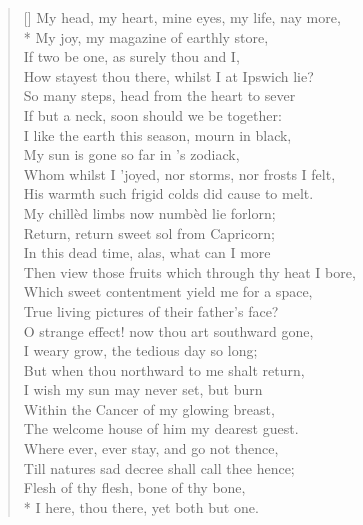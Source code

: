 \documentclass[MAIN]{subfiles}
\begin{document}
\settowidth{\versewidth}{My head, my heart, mine eyes, my life, nay more,}
\begin{verse}[\versewidth]
My head, my heart, mine eyes, my life, nay more,\\* 
My joy, my magazine of earthly store,\\ 
If two be one, as surely thou and I,\\
How stayest thou there, whilst I at {\sc Ipswich} lie?\\
So many steps, head from the heart to sever\\
If but a neck, soon should we be together:\\
I like the earth this season, mourn in black,\\
My sun is gone so far in 's zodiack,\\
Whom whilst I 'joyed, nor storms, nor frosts I felt,\\
His warmth such frigid colds did cause to melt.\\
My chill\`ed limbs now numb\`ed lie forlorn;\\
Return, return sweet {\hge sol} from Capricorn;\\
In this dead time, alas, what can I more\\
Then view those fruits which through thy heat I bore,\\
Which sweet contentment yield me for a space,\\
True living pictures of their father's face?\\
O strange effect! now thou art southward gone,\\
I weary grow, the tedious day so long;\\
But when thou northward to me shalt return,\\ 
I wish my sun may never set, but burn\\
Within the Cancer of my glowing breast,\\
The welcome house of him my dearest guest.\\
Where ever, ever stay, and go not thence,\\
Till natures sad decree shall call thee hence;\\
Flesh of thy flesh, bone of thy bone,\\*
I here, thou there, yet both but one.
\end{verse}
\end{document}
